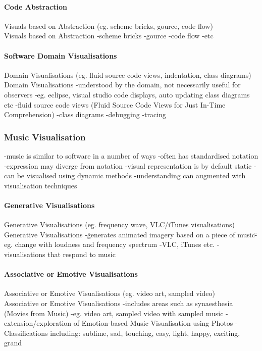 \paragraph{Code Abstraction}
Visuals based on Abstraction (eg. scheme bricks, gource, code flow)\\

Visuals based on Abstraction
-scheme bricks
-gource
-code flow
-etc
\paragraph{Software Domain Visualisations}
Domain Visualisations (eg. fluid source code views, indentation, class diagrams)\\

Domain Visualisations
-understood by the domain, not necessarily useful for observers
-eg. eclipse, visual studio code displays, auto updating class diagrams etc
-fluid source code views (Fluid Source Code Views for Just In-Time Comprehension)
-class diagrams
-debugging
-tracing

\subsubsection{Music Visualisation}
-music is similar to software in a number of ways
-often has standardised notation
-expression may diverge from notation
-visual representation is by default static
-can be visualised using dynamic methods
-understanding can augmented with visualisation techniques

\paragraph{Generative Visualisations}
Generative Visualisations (eg. frequency wave, VLC/iTunes visualisations)\\

Generative Visualisations
-\"generates animated imagery based on a piece of music\"
-eg. change with loudness and frequency spectrum
-VLC, iTunes etc.
-visualisations that respond to music

\paragraph{Associative or Emotive Visualisations}
Associative or Emotive Visualisations (eg. video art, sampled video)\\

Associative or Emotive Visualisations
-includes areas such as synaesthesia (Movies from Music)
-eg. video art, sampled video with sampled music
-extension/exploration of Emotion-based Music Visualisation using Photos
-Classifications including: sublime, sad, touching, easy, light, happy, exciting, grand


